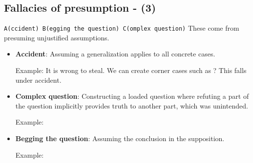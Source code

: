 \documentclass[5pt]{book}
\begin{document}
\subsection{Fallacies of presumption - (3)}
\texttt{A(ccident) B(egging the question) C(omplex question)}
These come from presuming unjustified assumptions.
\begin{itemize}
    \item \textbf{Accident}: Assuming a generalization applies to all concrete
        cases. 

        Example: It is wrong to steal. We can create corner cases such as 
        ? This falls under accident.

    \item \textbf{Complex question}: Constructing a loaded question where
        refuting a part of the question implicitly provides truth to another
        part, which was unintended.

        Example: 

    \item \textbf{Begging the question}: Assuming the conclusion in the 
        supposition.

        Example: 
\end{itemize}
\end{document}
